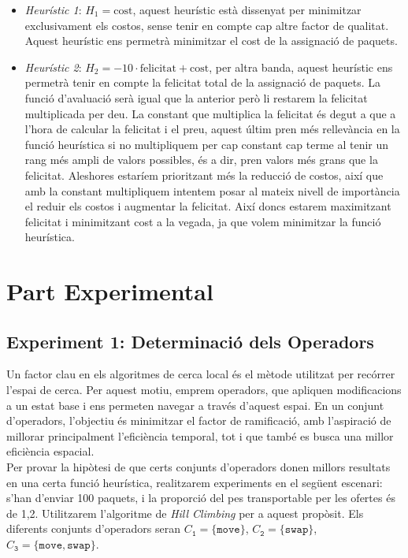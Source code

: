 \documentclass[a4paper]{article}
\begin{document}
	\begin{itemize}
		\item \emph{Heurístic 1}: $H_1 = \text{cost}$, aquest heurístic està dissenyat per minimitzar exclusivament els costos, sense tenir en compte cap altre factor de qualitat. Aquest heurístic ens permetrà minimitzar el cost de la assignació de paquets.
		\item \emph{Heurístic 2}: $H_2 = -10 \cdot \text{felicitat} + \text{cost}$, per altra banda, aquest heurístic ens permetrà tenir en compte la felicitat total de la assignació de paquets. La funció d'avaluació serà igual que la anterior però li restarem la felicitat multiplicada per deu. La constant que multiplica la felicitat és degut a que a l'hora de calcular la felicitat i el preu, aquest últim pren més rellevància en la funció heurística si no multipliquem per cap constant cap terme al tenir un rang més ampli de valors possibles, és a dir, pren valors més grans que la felicitat. Aleshores estaríem prioritzant més la reducció de costos, així que amb la constant multipliquem intentem posar al mateix nivell de importància el reduir els costos i augmentar la felicitat. Així doncs estarem maximitzant felicitat i minimitzant cost a la vegada, ja que volem minimitzar la funció heurística.
	\end{itemize}
	
	\newpage
	\section{Part Experimental}
	
	\subsection{Experiment 1: Determinació dels Operadors}
	\label{sec:exp1}
	
	Un factor clau en els algoritmes de cerca local és el mètode utilitzat per recórrer l'espai de cerca. Per aquest motiu, emprem operadors, que apliquen modificacions a un estat base i ens permeten navegar a través d'aquest espai. En un conjunt d'operadors, l'objectiu és minimitzar el factor de ramificació, amb l'aspiració de millorar principalment l'eficiència temporal, tot i que també es busca una millor eficiència espacial. \\
	
	Per provar la hipòtesi de que certs conjunts d'operadors donen millors resultats en una certa funció heurística, realitzarem experiments en el següent escenari: s'han d'enviar 100 paquets, i la proporció del pes transportable per les ofertes és de 1,2. Utilitzarem l'algoritme de \textit{Hill Climbing} per a aquest propòsit. Els diferents conjunts d'operadors seran $C_{\texttt{1}} = \{\texttt{move}\}$, $C_{\texttt{2}} = \{\texttt{swap}\}$, $C_{\texttt{3}} = \{\texttt{move}, \texttt{swap}\}$. \\
	
\end{document}
